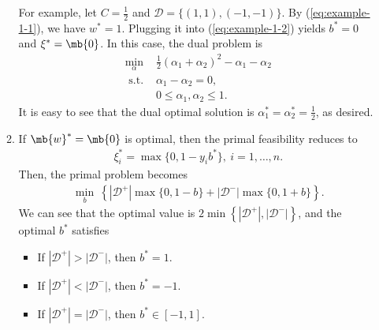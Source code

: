 \begin{exercise}
\begin{enumerate}
\begin{solution}
\begin{enumerate}
                        For example, let $C = \frac{1}{2}$ and $\mathcal{D} = \{(1, 1), (-1, -1)\}$. By (\ref{eq:example-1-1}), we have $w^* = 1$. Plugging it into (\ref{eq:example-1-2}) yields $b^* = 0$ and $\xi^* = \mb{0}$. In this case, the dual problem is
                        \begin{align*}
                            \min_{\alpha} \  & \frac{1}{2}(\alpha_1 + \alpha_2)^2 - \alpha_1 - \alpha_2 \\
                            \text{ s.t. }    & \alpha_1 - \alpha_2 = 0,                                 \\
                                             & 0 \le \alpha_1, \alpha_2 \le 1.
                        \end{align*}
                        It is easy to see that the dual optimal solution is $\alpha_1^* = \alpha_2^* = \frac{1}{2}$, as desired.
                    \item If $\mb{w}^* = \mb{0}$ is optimal, then the primal feasibility reduces to
                        \begin{align*}
                            \xi_i^* = \max\{0, 1-y_i b^*\},\ i=1,\ldots,n.
                        \end{align*}
                        Then, the primal problem becomes
                        \begin{align*}
                            \min_b \ \left\{|\mathcal{D}^+| \max\{0, 1- b\} + |\mathcal{D}^-|\max\{0, 1+ b\}\right\}.
                        \end{align*}
                        We can see that the optimal value is $2\min \left\{|\mathcal{D}^+|, |\mathcal{D}^-|\right\}$, and the optimal $b^*$ satisfies
                        \begin{itemize}
                            \item If $|\mathcal{D}^+| > |\mathcal{D}^-|$, then $b^* = 1$.
                            \item If $|\mathcal{D}^+| < |\mathcal{D}^-|$, then $b^* = -1$.
                            \item If $|\mathcal{D}^+| = |\mathcal{D}^-|$, then $b^* \in [-1,1]$.
                        \end{itemize}



\end{enumerate}
\end{solution}
\end{enumerate}
\end{exercise}
